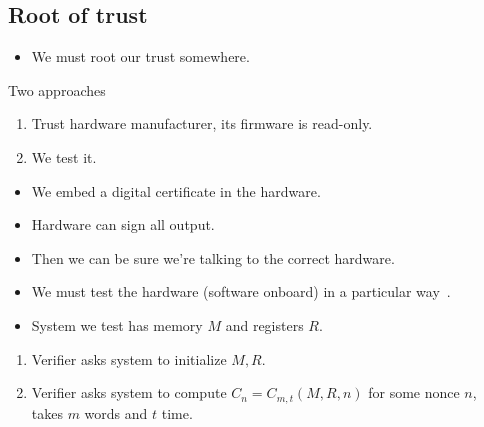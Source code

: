 \subsection{Root of trust}

\begin{frame}
  \begin{remark}
    \begin{itemize}
      \item We must root our trust somewhere.
    \end{itemize}
  \end{remark}

  \pause

  \begin{block}{Two approaches}
    \begin{enumerate}
      \item Trust hardware manufacturer, its firmware is read-only.
      \item We test it.
    \end{enumerate}
  \end{block}
\end{frame}

\begin{frame}
  \begin{example}
    \begin{itemize}
      \item We embed a digital certificate in the hardware.
      \item Hardware can sign all output.
      \item Then we can be sure we're talking to the correct hardware.
    \end{itemize}
  \end{example}
\end{frame}

\begin{frame}
  \begin{example}
    \begin{itemize}
      \item We must test the hardware (software onboard) in a particular 
        way~\cite{EstablishRootOfTrustUnconditionally}.

      \item System we test has memory \(M\) and registers \(R\).
    \end{itemize}
    \begin{enumerate}
      \item Verifier asks system to initialize \(M, R\).

      \item Verifier asks system to compute \(C_n = C_{m,t}(M, R, n)\) for some 
        nonce \(n\), takes \(m\) words and \(t\) time.
    \end{enumerate}
  \end{example}
\end{frame}

